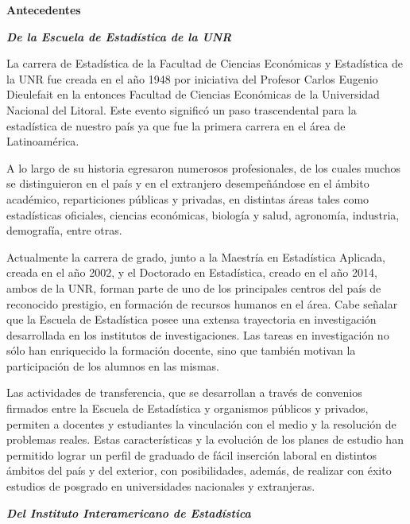 \documentclass[12pt,twoside,a4paper]{article}
\begin{document}
\vspace*{1cm}
\centerline{\textbf{\LARGE{Antecedentes}}}
\vspace*{1cm}
{}


\bigbreak

\noindent \textbf{\textit{De la Escuela de Estadística de la UNR}}

La carrera de Estadística de la Facultad de Ciencias Económicas y Estadística de la UNR fue creada en el año 1948 por iniciativa del Profesor Carlos Eugenio Dieulefait en la entonces Facultad de Ciencias Económicas de la Universidad Nacional del Litoral. Este evento significó un paso trascendental para la estadística de nuestro país ya que  fue la primera carrera en el área de Latinoamérica.

A lo largo de su historia egresaron numerosos profesionales, de los cuales muchos se distinguieron en el país y en el extranjero desempeñándose en el ámbito académico, reparticiones públicas y privadas, en distintas áreas tales como  estadísticas oficiales, ciencias económicas, biología y salud, agronomía, industria, demografía, entre otras.

Actualmente la carrera de grado, junto a la Maestría en Estadística Aplicada, creada en el año 2002, y el Doctorado en Estadística, creado en el año 2014, ambos de la UNR, forman parte de uno de los principales centros del país de reconocido prestigio, en formación de recursos humanos en el área. 
Cabe señalar que la Escuela de Estadística posee una extensa trayectoria en investigación desarrollada en los institutos de investigaciones. Las tareas en investigación no sólo han enriquecido la formación docente, sino que también motivan la participación de los alumnos en las mismas. 

Las actividades de transferencia, que se desarrollan a través de convenios firmados entre la Escuela de Estadística y organismos públicos y privados, permiten a docentes y estudiantes la vinculación con el medio y la resolución de problemas reales.
Estas características y la evolución de los planes de estudio han permitido lograr un perfil de graduado de fácil inserción laboral en distintos ámbitos del país y del exterior, con posibilidades, además, de realizar con éxito estudios de posgrado en universidades nacionales y extranjeras.

\bigbreak
\noindent\textbf{\textit{Del Instituto Interamericano de Estadística}}
\end{document}
